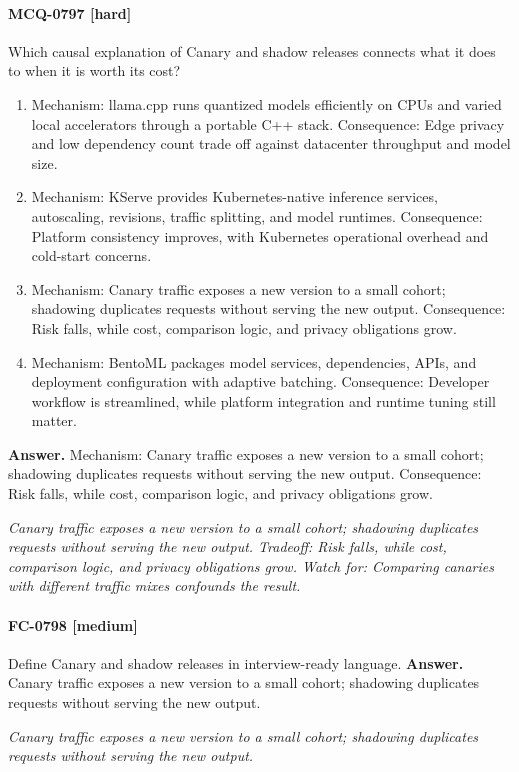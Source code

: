\paragraph{MCQ-0797 [hard]} Which causal explanation of Canary and shadow releases connects what it does to when it is worth its cost?
\begin{enumerate}[label=\Alph*.]
\item Mechanism: llama.cpp runs quantized models efficiently on CPUs and varied local accelerators through a portable C++ stack. Consequence: Edge privacy and low dependency count trade off against datacenter throughput and model size.
\item Mechanism: KServe provides Kubernetes-native inference services, autoscaling, revisions, traffic splitting, and model runtimes. Consequence: Platform consistency improves, with Kubernetes operational overhead and cold-start concerns.
\item Mechanism: Canary traffic exposes a new version to a small cohort; shadowing duplicates requests without serving the new output. Consequence: Risk falls, while cost, comparison logic, and privacy obligations grow.
\item Mechanism: BentoML packages model services, dependencies, APIs, and deployment configuration with adaptive batching. Consequence: Developer workflow is streamlined, while platform integration and runtime tuning still matter.
\end{enumerate}
\noindent\textbf{Answer.} Mechanism: Canary traffic exposes a new version to a small cohort; shadowing duplicates requests without serving the new output. Consequence: Risk falls, while cost, comparison logic, and privacy obligations grow.
\par\textit{Canary traffic exposes a new version to a small cohort; shadowing duplicates requests without serving the new output. Tradeoff: Risk falls, while cost, comparison logic, and privacy obligations grow. Watch for: Comparing canaries with different traffic mixes confounds the result.}
\paragraph{FC-0798 [medium]} Define Canary and shadow releases in interview-ready language.
\noindent\textbf{Answer.} Canary traffic exposes a new version to a small cohort; shadowing duplicates requests without serving the new output.
\par\textit{Canary traffic exposes a new version to a small cohort; shadowing duplicates requests without serving the new output.}
